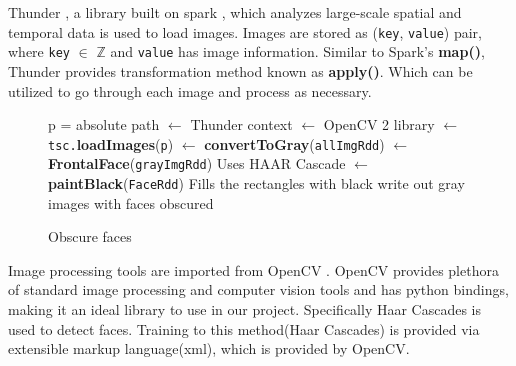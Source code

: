 \documentclass[
	submission,
	final,
	notitlepage,
	narroweqnarray,
	inline,
	twoside,
	]{ieee}
\begin{document}
Thunder \cite{thunder}, a library built on spark \cite{spark}, which analyzes large-scale
spatial and temporal data is used to load images. Images are stored as ({\tt key}, {\tt value})
pair, where {\tt key} $\in$ $\mathbb{Z}$ and {\tt value} has image information. Similar to
Spark's {\bf map()}, Thunder provides transformation method known as {\bf apply()}. Which
can be utilized to go through each image and process as necessary.\\
\begin{figure}[h!]
  \begin{algorithmic}[1]
     \Comment p = absolute path
		 $\gets$ Thunder context
		 $\gets$ OpenCV 2 library
		 $\gets$ {\tt tsc.}{\bf loadImages}({\tt p})
		 $\gets$ {\bf convertToGray}({\tt allImgRdd})
		 $\gets$ {\bf FrontalFace}({\tt grayImgRdd}) \Comment Uses HAAR Cascade
		 $\gets$ {\bf paintBlack}({\tt FaceRdd}) \Comment Fills the rectangles with black
		 \Comment write out gray images with faces obscured
    \EndFunction
  \end{algorithmic}
  \caption{Obscure faces}
\end{figure}
Image processing tools are imported from OpenCV \cite{opencv}. OpenCV provides plethora of standard
image processing and computer vision tools and has python bindings, making it an ideal
library to use in our project. Specifically Haar Cascades is used to detect faces. Training
to this method(Haar Cascades) is provided via extensible markup language(xml), which is provided
by OpenCV.
\end{document}
